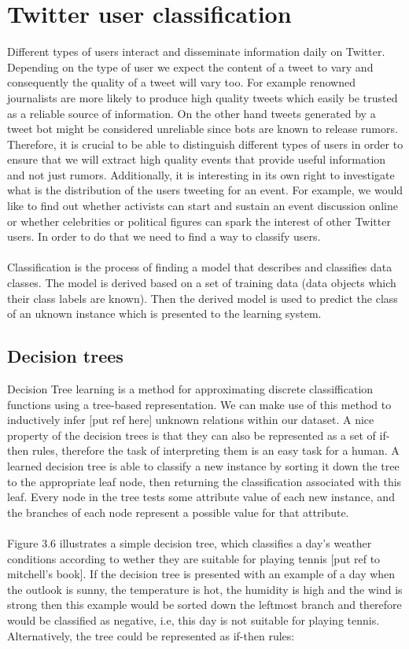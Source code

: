 \section{Twitter user classification}
Different types of users interact and disseminate information daily on Twitter. Depending on the type of user we expect the content of a tweet to vary and consequently the quality of a tweet will vary too. For example renowned journalists are more likely to produce high quality tweets which easily be trusted as a reliable source of information. On the other hand tweets generated by a tweet bot might be considered unreliable since bots are known to release rumors. Therefore, it is crucial to be able to distinguish different types of users in order to ensure that we will extract high quality events that provide useful information and not just rumors. Additionally, it is interesting in its own right to investigate what is the distribution of the users tweeting for an event. For example, we would like to find out whether activists can start and sustain an event discussion online or whether celebrities or political figures can spark the interest of other Twitter users. In order to do that we need to find a way to classify users.\\\\ 
Classification is the process of finding a model that describes and classifies data classes. The model is derived based on a set of training data (data objects which their class labels are known). Then the derived model is used to predict the class of an uknown instance which is presented to the learning system.    

\subsection{Decision trees}
Decision Tree learning is a method for approximating discrete classiffication functions using a tree-based representation. We can make use of this method to inductively infer [put ref here] unknown relations within our dataset. A nice property of the decision trees is that they can also be represented as a set of if-then rules, therefore the task of interpreting them is an easy task for a human. A learned decision tree is able to classify a new instance by sorting it down the tree to the appropriate leaf node, then returning the classification associated with this leaf. Every node in the tree tests some attribute value of each new instance, and the branches of each node represent a possible value for that attribute.\\\\
Figure 3.6 illustrates a simple decision tree, which classifies a day's weather conditions according to wether they are suitable for playing tennis [put ref to mitchell's book]. If the decision tree is presented with an example of a day when the outlook is sunny, the temperature is hot, the humidity is high and the wind is strong then this example would be sorted down the leftmost branch and therefore would be classified as negative, i.e, this day is not suitable for playing tennis. Alternatively, the tree could be represented as if-then rules:\\  


